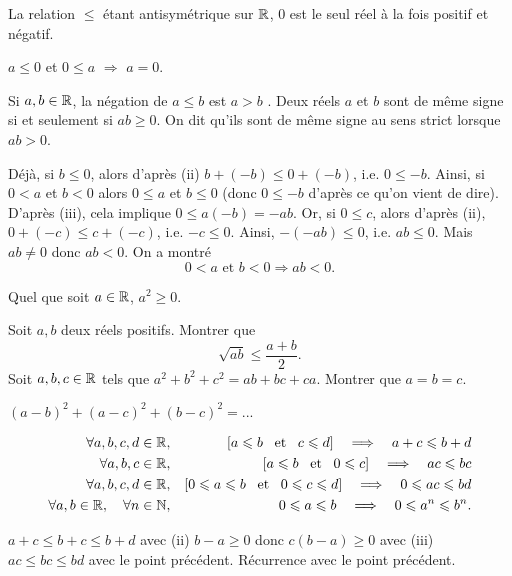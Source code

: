 \documentclass{magnoliaold}
\begin{document}
\begin{remarques}
\remarque La relation $\leq$ étant antisymétrique sur $\mathbb{R}$, 0 est le seul réel
  à la fois positif et négatif.
  \begin{sol}
  $a\leq 0$ et $0\leq a$ $\Rightarrow$ $a=0$.
  \end{sol}
\remarque Si $a,b\in\mathbb{R}$, la négation de \og $a\leq b$ \fg  est \og $a>b$ \fg.
\remarque Deux réels $a$ et $b$ sont de même signe si et
  seulement si $ab\geq 0$. On dit qu'ils sont de même signe au sens strict
  lorsque $ab>0$.
\begin{sol}
Déjà, si $b\leq 0$, alors d'après (ii) $b+(-b)\leq 0+(-b)$, i.e. $0\leq -b$.
Ainsi, si $0<a$ et $b<0$ alors $0\leq a$ et $b\leq 0$ (donc $0\leq -b$ d'après ce qu'on vient de dire). D'après (iii), cela implique $0\leq a(-b)=-ab$.
Or, si $0\leq c$, alors d'après (ii), $0+(-c)\leq c+(-c)$, i.e. $-c\leq 0$.
Ainsi, $-(-ab)\leq 0$, i.e. $ab\leq 0$. Mais $ab\neq 0$ donc $ab<0$.
On a montré $$0<a \text{ et } b<0 \Longrightarrow ab<0.$$
\end{sol}  
\remarque Quel que soit $a\in\mathbb{R}$, $a^2\geq 0$.
\end{remarques}

\begin{exos}
\exo Soit $a,b$ deux réels positifs. Montrer que
  \[\sqrt{ab}\leq\frac{a+b}{2}.\]
\exo Soit $a,b,c\in\mathbb{R}$ tels que $a^2+b^2+c^2=ab+bc+ca$. Montrer que
  $a=b=c$.
  \begin{sol}
  $(a-b)^2+(a-c)^2+(b-c)^2=...$
  \end{sol}
\end{exos}

\begin{proposition}
\begin{eqnarray*}
\forall a,b,c,d\in\mathbb{R}, & & \left[a\leqslant b \quad\!\text{et}\quad\! c\leqslant d\right]\quad\Longrightarrow\quad
       a+c\leqslant b+d\\
\forall a,b,c\in\mathbb{R}, & & \left[a\leqslant b \quad\!\text{et}\quad\! 0\leqslant c\right]\quad\Longrightarrow\quad ac\leqslant bc\\
\forall a,b,c,d\in\mathbb{R}, & & \left[0\leqslant a\leqslant b \quad\!\text{et}\quad\! 0\leqslant c\leqslant d\right]\quad\Longrightarrow\quad
       0\leqslant ac\leqslant bd\\
\forall a,b\in\mathbb{R}, \quad \forall n\in\mathbb{N}, & & 0\leqslant a\leqslant b \quad\Longrightarrow\quad
  0\leqslant a^n\leqslant b^n.
\end{eqnarray*}
\end{proposition}

\begin{preuve}
$a+c\leq b+c\leq b+d$ avec (ii)
$b-a\geq 0$ donc $c(b-a)\geq 0$ avec (iii)
$ac\leq bc \leq bd $ avec le point précédent.
Récurrence avec le point précédent.
\end{preuve}
\end{document}

